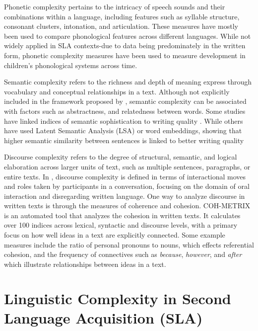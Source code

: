 Phonetic complexity pertains to the intricacy of speech sounds and their combinations within a language, including
features such as syllable structure, consonant clusters, intonation, and articulation\citep{Maddieson2009}.
These measures have mostly been used to compare phonological features across different languages. While not
widely applied in SLA contexts-due to data being predominately in the written form, phonetic complexity measures have
been
used to measure development in
children's
phonological systems across time\citep{StoelGammon2010}.

Semantic complexity refers to the richness and depth of meaning express through vocabulary and conceptual
relationships in a text. Although not explicitly included in the framework proposed by \cite{Butle2012}, semantic
complexity can be associated with factors such as abstractness, and relatedness between words. Some studies have
linked indices of semantic sophistication to writing quality \citep{Kyle2018}. While others have used Latent Semantic
Analysis (LSA) or word embeddings, showing that higher semantic similarity between sentences is linked to better
writing
quality
\citep{Crossley2011, Briscoe2010}

Discourse complexity refers to the degree of structural, semantic, and logical elaboration across larger units of
text, such as multiple sentences, paragraphs, or entire texts. In \cite{Butle2012}, discourse complexity is
defined in
terms of
interactional moves and roles taken by participants in a conversation, focusing on the domain of
oral
interaction and disregarding written language. One way to analyze discourse in written texts is through the measures of
coherence and cohesion.
COH-METRIX \cite{Graesser2004} is an automated tool that analyzes the cohesion in written texts. It calculates over
100 indices across lexical, syntactic and discourse levels, with a primary focus on how well ideas in a text are
explicitly connected. Some example measures include the ratio of personal pronouns to nouns, which effects
referential cohesion, and the frequency of connectives
such as \textit{because}, \textit{however}, and \textit{after} which illustrate relationships between ideas in a text.


\section{Linguistic Complexity in Second Language Acquisition (SLA)}

